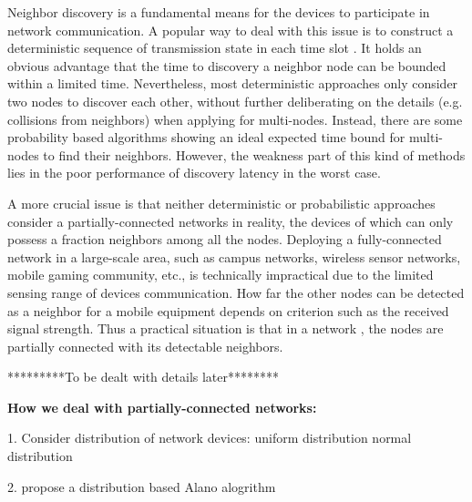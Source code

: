 Neighbor discovery is a fundamental means for the devices 
to participate in network communication.
A popular way to deal with this issue is to construct a deterministic 
sequence of transmission state in each time slot
\cite{wang2015blinddate,qiu2016talk,dutta2008practical,
sun2014hello,bakht2012searchlight,chen2015heterogeneous,kandhalu2010u}. 
It holds an obvious advantage that the time to discovery a neighbor 
node can be bounded within a limited time. 
Nevertheless, most deterministic approaches only consider two 
nodes to discover each other, without further deliberating on the details 
(e.g. collisions from neighbors) when applying for multi-nodes.
Instead, there are some probability based algorithms showing an ideal expected time 
bound for multi-nodes to find their neighbors. However, the weakness part 
of this kind of methods lies in the poor performance of discovery latency in the worst case.









A more crucial issue is that neither deterministic or probabilistic approaches 
consider a partially-connected networks in reality, 
the devices of which can only possess a fraction neighbors among all the nodes.
Deploying a fully-connected network in a large-scale area, 
such as campus networks, wireless sensor networks,
mobile gaming community, etc., is technically impractical 
due to the limited sensing range of devices communication.
How far the other nodes can be detected as a neighbor for a mobile equipment  
depends on criterion such as the received signal strength.
Thus a practical situation is that in a network , the nodes are partially connected with its  
detectable neighbors.


\vspace{3mm}
 *********To be dealt with details later********
 
 
\textbf{How we deal with partially-connected networks:}

1. Consider distribution of network devices: uniform distribution normal distribution

2. propose a distribution based Alano alogrithm

